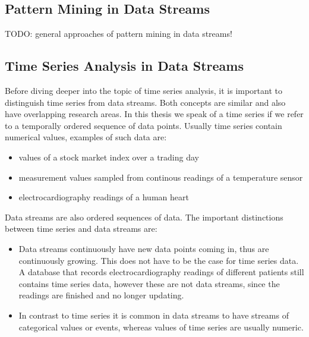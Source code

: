 \subsection{Pattern Mining in Data Streams}
\label{subsec_PatternMining}

TODO: general approaches of pattern mining in data streams!

\subsection{Time Series Analysis in Data Streams}
\label{subsec_timeSeriesAnalysis}
Before diving deeper into the topic of time series analysis, it is important to distinguish time series from data streams. Both concepts are similar and also have overlapping research areas. In this thesis we speak of a time series if we refer to a temporally ordered sequence of data points. Usually time series contain numerical values, examples of such data are:

\begin{itemize}
	\item values of a stock market index over a trading day
	\item measurement values sampled from continous readings of a temperature sensor
	\item electrocardiography readings of a human heart
\end{itemize}

Data streams are also ordered sequences of data. The important distinctions between time series and data streams are: 

\begin{itemize}
	\item Data streams continuously have new data points coming in, thus are continuously growing. This does not have to be the case for time series data. A database that records electrocardiography readings of different patients still contains time series data, however these are not data streams, since the readings are finished and no longer updating.
	\item In contrast to time series it is common in data streams to have streams of categorical values or events, whereas values of time series are usually numeric.
\end{itemize}

